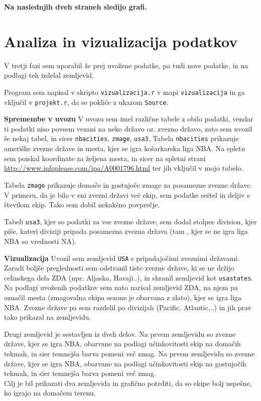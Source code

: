 \documentclass[11pt,a4paper]{article}
\begin{document}
\textbf{Na naslednjih dveh straneh sledijo grafi.}





\section{Analiza in vizualizacija podatkov}

V tretji fazi sem uporabil že prej uvožene podatke, pa tudi nove podatke, in na podlagi teh izdelal zemljevid.
\smallskip

Program sem napisal v skripto \verb|vizualizacija.r| v mapi \verb|vizualizacija| in ga vključil v \verb|projekt.r|, da se pokliče z ukazom \verb|Source|.
\bigskip

\textbf{Spremembe v uvozu}
V uvozu sem imel različne tabele z obilo podatki, vendar ti podatki niso povsem vezani na neko državo oz. zvezno državo, zato sem uvozil še nekaj tabel, in sicer \verb|nbacities|, \verb|zmage|, \verb|usa3|. Tabela \verb|nbacities| prikazuje ameriške zvezne države in mesta, kjer se igra košarkarska liga NBA. Na spletu sem poiskal koordinate za željena mesta, in sicer na spletni strani \url{http://www.infoplease.com/ipa/A0001796.html} ter jih vključil v mojo tabelo.

\smallskip

Tabela \verb|zmage| prikazuje domače in gostujoče zmage za posamezne zvezne države. V primeru, da je bilo v eni zvezni državi več ekip, sem podatke seštel in deljiv s številom ekip. Tako sem dobil nekakšno povprečje.
\smallskip

Tabeli \verb|usa3|, kjer so podatki za vse zvezne države, sem dodal stolpec division, kjer piše, kateri diviziji pripada posamezna zvezna država (tam , kjer se ne igra liga NBA so vrednosti NA).
\bigskip

\textbf{Vizualizacija}
\newline
Uvozil sem zemljevid \verb|USA| s pripadajočimi zveznimi državami. Zaradi boljše preglednosti sem odstranil tiste zvezne države, ki se ne držijo celinskega dela ZDA (npr. Aljaska, Havaji..), in shranil zemljevid kot \verb|usastates|. Na podlagi uvoženih podatkov sem nato narisal zemljevid ZDA, na njem pa označil mesta (zmagovalna ekipa sezone je obarvana z zlato), kjer se igra liga NBA. Zvezne države pa sem razdelil po divizijah (Pacific, Atlantic,..) in jih prav tako prikazal na zemljevidu.
\smallskip


Drugi zemljevid je sestavljen iz dveh delov. 
Na prvem zemljevidu so zvezne države, kjer se igra NBA, obarvane na podlagi učinkovitosti ekip na domačih tekmah, in sier temnejša barva pomeni več zmag.
Na prvem zemljevidu so zvezne države, kjer se igra NBA, obarvane na podlagi učinkovitosti ekip na gostujočih tekmah, in sier temnejša barva pomeni več zmag.\\
Cilj je bil prikazati dva zemljevida in grafično potrditi, da so ekipe bolj uspešne, ko igrajo na domačem terenu.
\end{document}
